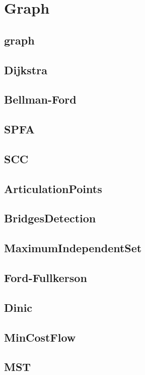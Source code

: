 \section{Graph}

\subsection{graph}


\subsection{Dijkstra}


\subsection{Bellman-Ford}


\subsection{SPFA}


\subsection{SCC}


\subsection{ArticulationPoints}


\subsection{BridgesDetection}


\subsection{MaximumIndependentSet}


\subsection{Ford-Fullkerson}


\subsection{Dinic}


\subsection{MinCostFlow}


\subsection{MST}

